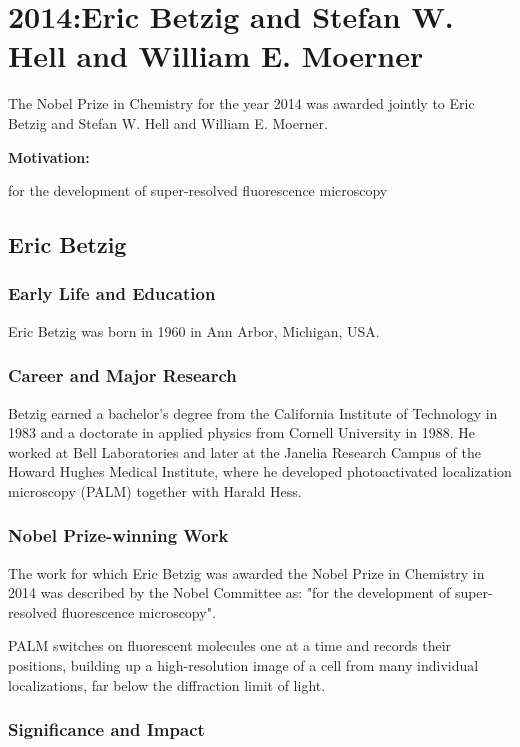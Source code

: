 \chapter{2014:Eric Betzig and Stefan W. Hell and William E. Moerner}

\label{chap:chemistry2014}

The Nobel Prize in Chemistry for the year 2014 was awarded jointly to Eric Betzig and Stefan W. Hell and William E. Moerner.

\textbf{Motivation:}

for the development of super-resolved fluorescence microscopy

\section{Eric Betzig}

\subsection*{Early Life and Education}

Eric Betzig was born in 1960 in Ann Arbor, Michigan, USA.

\subsection*{Career and Major Research}

Betzig earned a bachelor's degree from the California Institute of Technology in 1983 and a doctorate in applied physics from Cornell University in 1988. He worked at Bell Laboratories and later at the Janelia Research Campus of the Howard Hughes Medical Institute, where he developed photoactivated localization microscopy (PALM) together with Harald Hess.

\subsection*{Nobel Prize-winning Work}

The work for which Eric Betzig was awarded the Nobel Prize in Chemistry in 2014 was described by the Nobel Committee as: "for the development of super-resolved fluorescence microscopy".

PALM switches on fluorescent molecules one at a time and records their positions, building up a high-resolution image of a cell from many individual localizations, far below the diffraction limit of light.

\subsection*{Significance and Impact}

